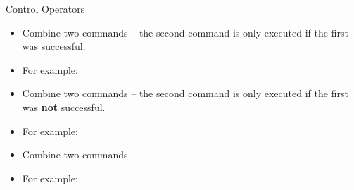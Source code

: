 \documentclass{setbeamer}
\begin{document}
\begin{frame}[fragile]{Control Operators}
    \begin{itemize}
        \item Combine two commands -- the second command is only executed if the first was successful.
        \item For example: 
    \end{itemize}

    \vspace{0.3cm}

    \begin{itemize}
        \item Combine two commands -- the second command is only executed if the first was \textbf{not} successful.
        \item For example: 
    \end{itemize}

    \vspace{0.3cm}

    \begin{itemize}
        \item Combine two commands.
        \item For example: 
    \end{itemize}
\end{frame}
\end{document}
